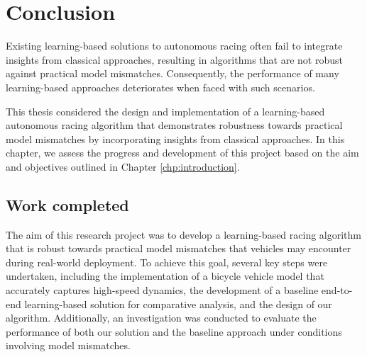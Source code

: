 \chapter{Conclusion}\label{chp:conclusion}



Existing learning-based solutions to autonomous racing often fail to integrate insights from classical approaches, resulting in algorithms that are not robust against practical model mismatches. 
Consequently, the performance of many learning-based approaches deteriorates when faced with such scenarios.

This thesis considered the design and implementation of a learning-based autonomous racing algorithm that demonstrates robustness towards practical model mismatches by incorporating insights from classical approaches.
In this chapter, we assess the progress and development of this project based on the aim and objectives outlined in Chapter \ref{chp:introduction}.



\section{Work completed}

The aim of this research project was to develop a learning-based racing algorithm that is robust towards practical model mismatches that vehicles may encounter during real-world deployment.
To achieve this goal, several key steps were undertaken, including the implementation of a bicycle vehicle model that accurately captures high-speed dynamics, the development of a baseline end-to-end learning-based solution for comparative analysis, and the design of our algorithm. Additionally, an investigation was conducted to evaluate the performance of both our solution and the baseline approach under conditions involving model mismatches.


